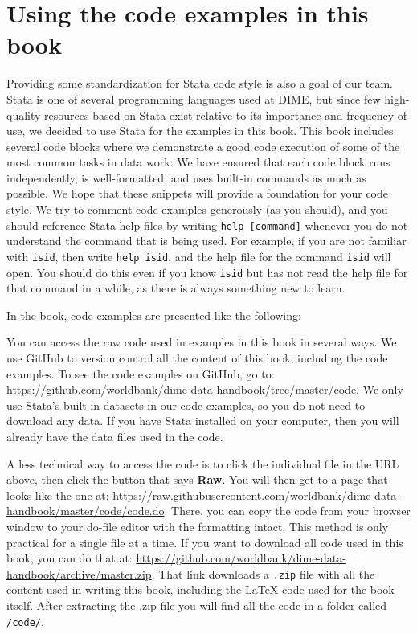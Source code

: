 \section{Using the code examples in this book}

Providing some standardization for Stata code style
is also a goal of our team.
Stata is one of several programming languages used at DIME,
but since few high-quality resources based on Stata exist
relative to its importance and frequency of use,
we decided to use Stata for the examples in this book.
This book includes several code blocks
where we demonstrate a good code execution
of some of the most common tasks in data work.
We have ensured that each code block runs independently,
is well-formatted,
and uses built-in commands as much as possible.
We hope that these snippets will provide a foundation for your code style.
We try to comment code examples generously (as you should),
and you should reference Stata help files by writing \texttt{help [command]}
whenever you do not understand the command that is being used.
For example, if you are not familiar with \texttt{isid},
 then write \texttt{help isid},
and the help file for the command \texttt{isid} will open.
You should do this even if you know \texttt{isid}
but has not read the help file for that command in a while,
as there is always something new to learn.

In the book, code examples are presented like the following:


You can access the raw code used in examples in this book in several ways.
We use GitHub to version control all the content of this book,
including the code examples.
To see the code examples on GitHub, go to:
\url{https://github.com/worldbank/dime-data-handbook/tree/master/code}.
We only use Stata's built-in datasets in our code examples,
so you do not need to download any data.
If you have Stata installed on your computer,
then you will already have the data files used in the code.

A less technical way to access the code
is to click the individual file in the URL above, then click
the button that says \textbf{Raw}.
You will then get to a page that looks like the one at:
\url{https://raw.githubusercontent.com/worldbank/dime-data-handbook/master/code/code.do}.
There, you can copy the code
from your browser window to your do-file editor with the formatting intact.
This method is only practical for a single file at a time.
If you want to download all code used in this book, you can do that at:
\url{https://github.com/worldbank/dime-data-handbook/archive/master.zip}.
That link downloads a \texttt{.zip} file
with all the content used in writing this book,
including the \LaTeX{} code used for the book itself.
After extracting the .zip-file you will find all the code in a folder called \texttt{/code/}.

